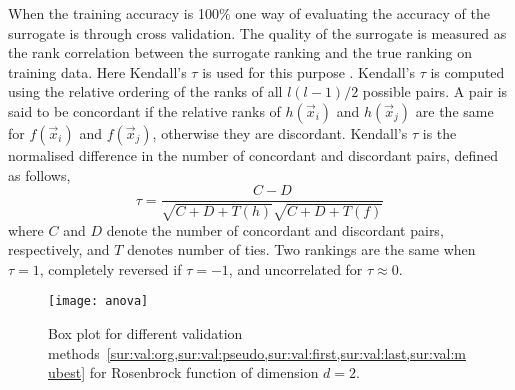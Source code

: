 When the training accuracy is 100\% one way of evaluating the accuracy of the surrogate is through cross validation. The quality of the surrogate is measured as the rank correlation between the surrogate ranking and the true ranking on training data. Here Kendall's $\tau$ is used for this purpose \citep[cf.][]{Kendall38}.  Kendall's $\tau$ is computed using the relative ordering of the ranks of all $l(l-1)/2$ possible pairs.  A pair is said to be concordant if the relative ranks of $h(\vec{x}_i)$ and $h(\vec{x}_j)$ are the same for $f(\vec{x}_i)$ and $f(\vec{x}_j)$, otherwise they are discordant. Kendall's $\tau$ is the normalised difference in the number of concordant and discordant pairs, defined as follows, %
\begin{equation}\label{eq:tau}
\tau = \frac{C-D}{\sqrt{C+D+T(h)}\sqrt{C+D+T(f)}}
\end{equation}
where $C$ and $D$ denote the number of concordant and discordant pairs, respectively, and $T$ denotes number of ties. %
Two rankings are the same when $\tau=1$, completely reversed if $\tau = -1$, and uncorrelated for $\tau \approx 0$.

\begin{figure}
\texttt{[image: anova]}
\caption[Box plot for different validation strategies]{Box plot for different validation methods~\cref{sur:val:org,sur:val:pseudo,sur:val:first,sur:val:last,sur:val:mubest} for Rosenbrock function of dimension $d=2$.}
\label{fig:boxplot}
\end{figure}

